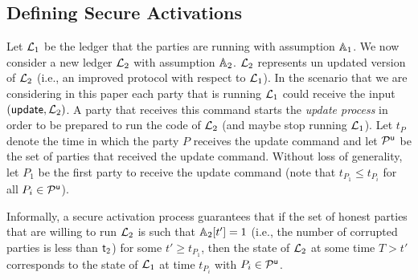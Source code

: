 \subsection{Defining Secure Activations}
Let $\mathcal{L}_1$ be the ledger that the parties are running with assumption $\mathbb{A}_1$. We now consider a new ledger $\mathcal{L}_2$ with assumption $\mathbb{A}_2$.
$\mathcal{L}_2$ represents un updated version of $\mathcal{L}_2$ (i.e., an improved protocol with respect to $\mathcal{L}_1$).
In the scenario that we are considering in this paper each party that is running $\mathcal{L}_1$ could receive the input $(\mathsf{update}, \mathcal{L}_2)$. A party
that receives this command starts the \emph{update process}
in order to be prepared to run the code of $\mathcal{L}_2$ (and maybe stop running $\mathcal{L}_1$). Let $t_P$ denote the time in which 
the party $P$ receives the update command and let $\mathcal{P}^\mathsf{u}$ be the set of parties that received the update command. Without loss of generality, let $P_1$ be the first party to receive the update command (note that $t_{P_1}\leq t_{P_i}$ for all $P_i\in\mathcal{P}^\mathsf{u}$).

Informally, a secure activation process guarantees that if the set of honest parties that are willing to run $\mathcal{L}_2$ 
is such that $\mathbb{A}_2[t']=1$   (i.e., the number of corrupted parties is less
than $\mathsf{t}_2$) for some $t'\geq t_{P_1}$, then
the state of $\mathcal{L}_2$ at some time $T>t'$ corresponds to the state of $\mathcal{L}_1$ at time $t_{P_i}$ with $P_i\in\mathcal{P}^\mathsf{u}$.

 



